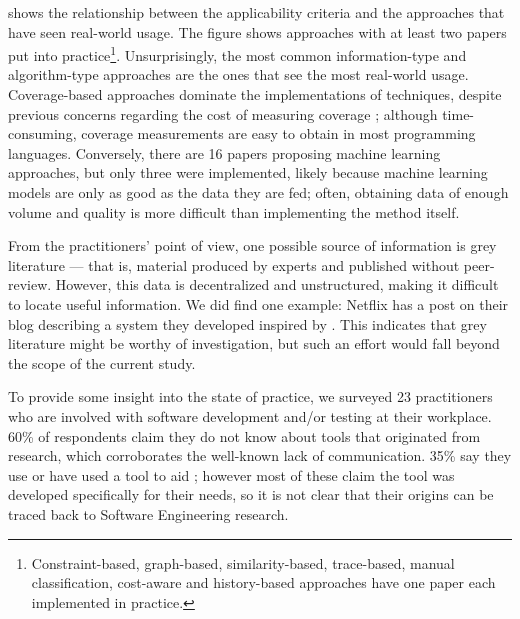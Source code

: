 
 shows the relationship between the applicability criteria and the approaches that have seen real-world usage.
The figure shows approaches with at least two papers put into practice\footnote{Constraint-based, graph-based, similarity-based, trace-based, manual classification, cost-aware and history-based approaches have one paper each implemented in practice.}.
Unsurprisingly, the most common information-type and algorithm-type approaches are the ones that see the most real-world usage.
Coverage-based approaches dominate the implementations of techniques, despite previous concerns regarding the cost of measuring coverage \cite{herzigkeynote}; although time-consuming, coverage measurements are easy to obtain in most programming languages.
Conversely, there are 16 papers proposing machine learning approaches, but only three were implemented, likely because machine learning models are only as good as the data they are fed; often, obtaining data of enough volume and quality is more difficult than implementing the method itself.

From the practitioners' point of view, one possible source of information is grey literature --- that is, material produced by experts and published without peer-review.
However, this data is decentralized and unstructured, making it difficult to locate useful information.
We did find one example: Netflix has a post on their blog \cite{netflixlerner} describing a system they developed inspired by .
This indicates that grey literature might be worthy of investigation, but such an effort would fall beyond the scope of the current study.

To provide some insight into the state of practice, we surveyed 23 practitioners who are involved with software development and/or testing at their workplace.
60\% of respondents claim they do not know about \rt tools that originated from research, which corroborates the well-known lack of communication.
35\% say they use or have used a tool to aid \rt; however most of these claim the tool was developed specifically for their needs, so it is not clear that their origins can be traced back to Software Engineering research.


